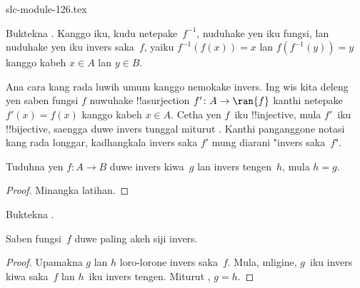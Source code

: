 \begin{filecontents*}[overwrite]{slc-module-126.tex}
\begin{prob}
Buktekna . Kanggo iku, kudu
netepake~$f^{-1}$, nuduhake yen iku fungsi, lan nuduhake yen iku
invers saka~$f$, yaiku $f^{-1}(f(x)) = x$ lan $f(f^{-1}(y)) = y$ kanggo
kabeh $x \in A$ lan $y \in B$.
\end{prob}

\begin{explain}
Ana cara kang rada luwih umum kanggo nemokake invers. Ing
 wis kita deleng yen saben fungsi $f$ nuwuhake !!a{surjection} $f'
\colon A \to \ran{f}$ kanthi netepake $f'(x) = f(x)$ kanggo kabeh $x \in A$.
Cetha yen $f$~iku !!{injective}, mula $f'$~iku !!{bijective}, saengga
duwe invers tunggal miturut . Kanthi
panganggone notasi kang rada longgar, kadhangkala invers saka $f'$
mung diarani "invers saka~$f$".
\end{explain}

\begin{prop}%
  Tuduhna yen $f\colon A \to B$ duwe invers kiwa~$g$ lan invers
  tengen~$h$, mula $h = g$.
\end{prop}

\begin{proof}
  Minangka latihan.
\end{proof}

\begin{prob}
  Buktekna .
\end{prob}

\begin{prop}
Saben fungsi~$f$ duwe paling akeh siji invers.
\end{prop}

\begin{proof}
  Upamakna $g$ lan $h$ loro-lorone invers saka~$f$. Mula, mligine,
  $g$~iku invers kiwa saka~$f$ lan $h$~iku invers tengen. Miturut
  , $g = h$.
\end{proof}


\end{filecontents*}

